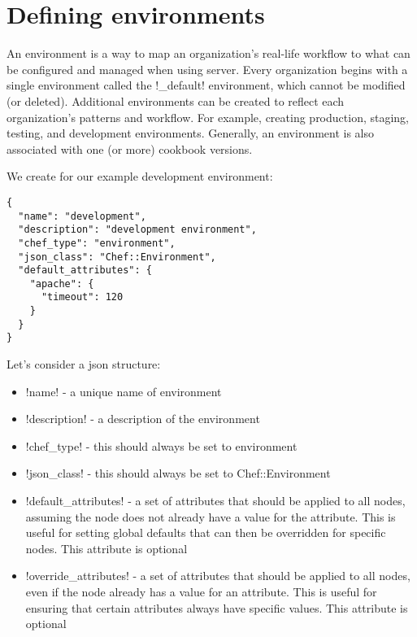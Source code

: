\section{Defining environments}
\label{sec:solo-environment}

An environment is a way to map an organization's real-life workflow to what can be configured and managed when using server. Every organization begins with a single environment called the \inline!_default! environment, which cannot be modified (or deleted). Additional environments can be created to reflect each organization's patterns and workflow. For example, creating production, staging, testing, and development environments. Generally, an environment is also associated with one (or more) cookbook versions.

We create for our example development environment:

\begin{lstlisting}[label=lst:my-cloud-chef-environment1,title=my-cloud/environments/development.json]
{
  "name": "development",
  "description": "development environment",
  "chef_type": "environment",
  "json_class": "Chef::Environment",
  "default_attributes": {
    "apache": {
      "timeout": 120
    }
  }
}
\end{lstlisting}

Let's consider a json structure:

\begin{itemize}
  \item \inline!name! - a unique name of environment
  \item \inline!description! - a description of the environment
  \item \inline!chef_type! - this should always be set to environment
  \item \inline!json_class! - this should always be set to Chef::Environment
  \item \inline!default_attributes! - a set of attributes that should be applied to all nodes, assuming the node does not already have a value for the attribute. This is useful for setting global defaults that can then be overridden for specific nodes. This attribute is optional
  \item \inline!override_attributes! - a set of attributes that should be applied to all nodes, even if the node already has a value for an attribute. This is useful for ensuring that certain attributes always have specific values. This attribute is optional
\end{itemize}

